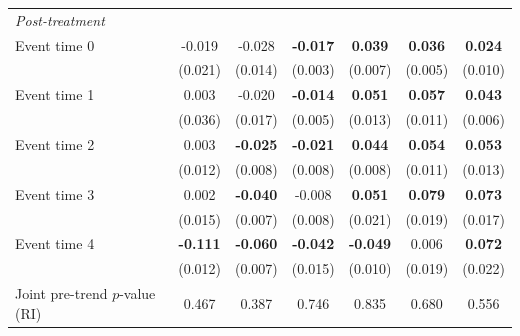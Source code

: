 \begin{table}[htbp]
{{\begin{tabular}{lcccccc}
      \multicolumn{7}{l}{\textit{Post-treatment}}\\
      Event time 0 & -0.019 & -0.028 & \textbf{-0.017} & \textbf{0.039} & \textbf{0.036} & \textbf{0.024}\\
       & (0.021) & (0.014) & (0.003) & (0.007) & (0.005) & (0.010)\\
      Event time 1 & 0.003 & -0.020 & \textbf{-0.014} & \textbf{0.051} & \textbf{0.057} & \textbf{0.043}\\
       & (0.036) & (0.017) & (0.005) & (0.013) & (0.011) & (0.006)\\
      Event time 2 & 0.003 & \textbf{-0.025} & \textbf{-0.021} & \textbf{0.044} & \textbf{0.054} & \textbf{0.053}\\
       & (0.012) & (0.008) & (0.008) & (0.008) & (0.011) & (0.013)\\
      Event time 3 & 0.002 & \textbf{-0.040} & -0.008 & \textbf{0.051} & \textbf{0.079} & \textbf{0.073}\\
       & (0.015) & (0.007) & (0.008) & (0.021) & (0.019) & (0.017)\\
      Event time 4 & \textbf{-0.111} & \textbf{-0.060} & \textbf{-0.042} & \textbf{-0.049} & 0.006 & \textbf{0.072}\\
       & (0.012) & (0.007) & (0.015) & (0.010) & (0.019) & (0.022)\\
      \midrule
      Joint pre-trend $p$-value (RI) & 0.467 & 0.387 & 0.746 & 0.835 & 0.680 & 0.556\\
      \bottomrule
   \end{tabular}}}
\end{table}

